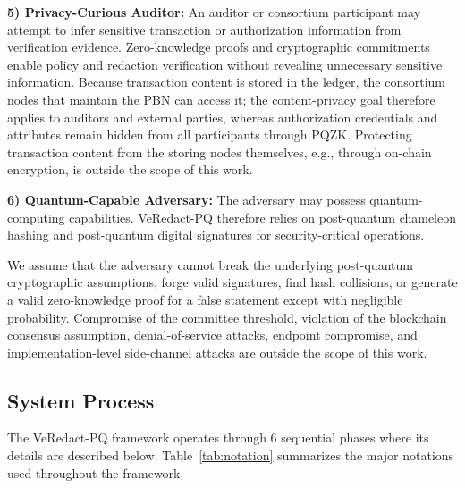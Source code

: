 \documentclass[lettersize,journal]{IEEEtran}
\begin{document}
    \textbf{5) Privacy-Curious Auditor:}
    An auditor or consortium participant may attempt to infer sensitive
    transaction or authorization information from verification evidence.
    Zero-knowledge proofs and cryptographic commitments enable policy and
    redaction verification without revealing unnecessary sensitive
    information. {Because transaction content is stored in the ledger, the
    consortium nodes that maintain the PBN can access it; the content-privacy
    goal therefore applies to auditors and external parties, whereas
    authorization credentials and attributes remain hidden from all
    participants through PQZK. Protecting transaction content from the
    storing nodes themselves, e.g., through on-chain encryption, is outside
    the scope of this work.}
    
    \textbf{6) Quantum-Capable Adversary:}
    The adversary may possess quantum-computing capabilities. VeRedact-PQ
    therefore relies on post-quantum chameleon hashing and post-quantum
    digital signatures for security-critical operations.
    
    We assume that the adversary cannot break the underlying post-quantum
    cryptographic assumptions, forge valid signatures, find hash
    collisions, or generate a valid zero-knowledge proof for a false
    statement except with negligible probability. Compromise of the
    committee threshold, violation of the blockchain consensus assumption,
    denial-of-service attacks, endpoint compromise, and implementation-level
    side-channel attacks are outside the scope of this work.
    
    
    
    \subsection{System Process}
    
    The VeRedact-PQ framework operates through 6 sequential phases where its details are described below. Table~\ref{tab:notation} summarizes the major notations used throughout the framework.
    
\end{document}

